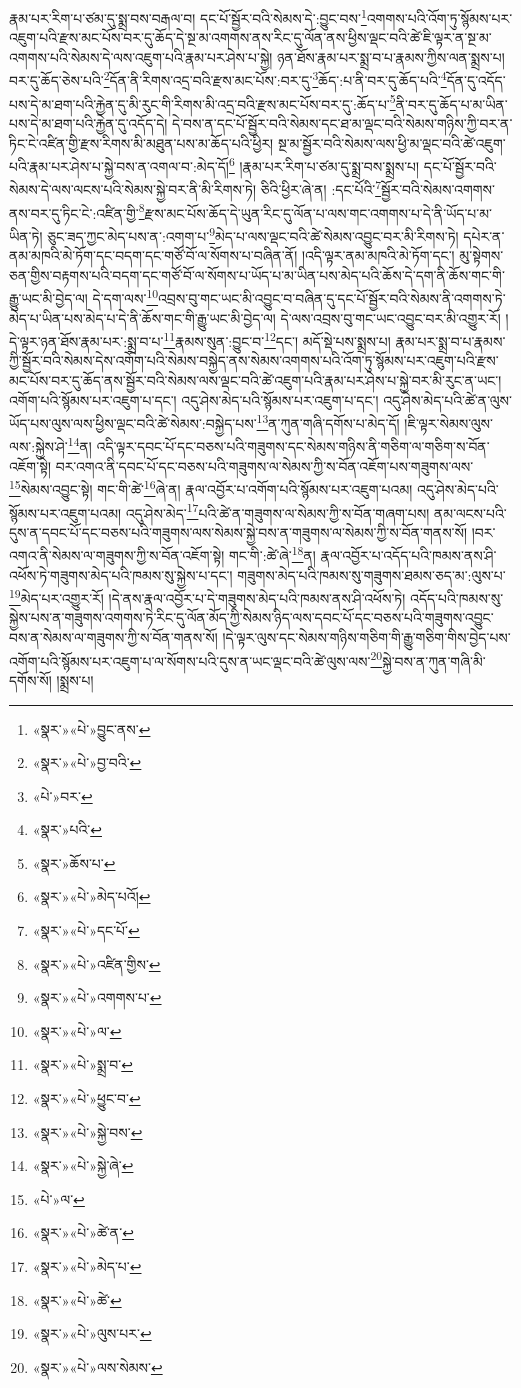 རྣམ་པར་རིག་པ་ཙམ་དུ་སྨྲ་བས་བརྒལ་བ། དང་པོ་སྦྱོར་བའི་སེམས་དེ་:བྱུང་བས་\footnote{«སྣར་»«པེ་»བྱུང་ནས་}འགགས་པའི་འོག་ཏུ་སྙོམས་པར་འཇུག་པའི་རྫས་མང་པོས་བར་དུ་ཆོད་དེ་སྔ་མ་འགགས་ནས་རིང་དུ་ལོན་ནས་ཕྱིས་ལྡང་བའི་ཚེ་ཇི་ལྟར་ན་སྔ་མ་འགགས་པའི་སེམས་དེ་ལས་འཇུག་པའི་རྣམ་པར་ཤེས་པ་སྐྱེ། ཉན་ཐོས་རྣམ་པར་སྨྲ་བ་པ་རྣམས་ཀྱིས་ལན་སྨྲས་པ། བར་དུ་ཆོད་ཅེས་པའི་\footnote{«སྣར་»«པེ་»བྱ་བའི་}དོན་ནི་རིགས་འདྲ་བའི་རྫས་མང་པོས་:བར་དུ་\footnote{«པེ་»བར་}ཆོད་:པ་ནི་བར་དུ་ཆོད་པའི་\footnote{«སྣར་»པའི་}དོན་དུ་འདོད་པས་དེ་མ་ཐག་པའི་རྐྱེན་དུ་མི་རུང་གི་རིགས་མི་འདྲ་བའི་རྫས་མང་པོས་བར་དུ་:ཆོད་པ་\footnote{«སྣར་»ཆོས་པ་}ནི་བར་དུ་ཆོད་པ་མ་ཡིན་པས་དེ་མ་ཐག་པའི་རྐྱེན་དུ་འདོད་དེ། དེ་བས་ན་དང་པོ་སྦྱོར་བའི་སེམས་དང་ཐ་མ་ལྡང་བའི་སེམས་གཉིས་ཀྱི་བར་ན་ཏིང་ངེ་འཛིན་གྱི་རྫས་རིགས་མི་མཐུན་པས་མ་ཆོད་པའི་ཕྱིར། སྔ་མ་སྦྱོར་བའི་སེམས་ལས་ཕྱི་མ་ལྡང་བའི་ཚེ་འཇུག་པའི་རྣམ་པར་ཤེས་པ་སྐྱེ་བས་ན་འགལ་བ་:མེད་དོ།\footnote{«སྣར་»«པེ་»མེད་པའོ།} །རྣམ་པར་རིག་པ་ཙམ་དུ་སྨྲ་བས་སྨྲས་པ། དང་པོ་སྦྱོར་བའི་སེམས་དེ་ལས་ལངས་པའི་སེམས་སྐྱེ་བར་ནི་མི་རིགས་ཏེ། ཅིའི་ཕྱིར་ཞེ་ན། :དང་པོའི་\footnote{«སྣར་»«པེ་»དང་པོ་}སྦྱོར་བའི་སེམས་འགགས་ནས་བར་དུ་ཏིང་ངེ་:འཛིན་གྱི་\footnote{«སྣར་»«པེ་»འཛིན་གྱིས་}རྫས་མང་པོས་ཆོད་དེ་ཡུན་རིང་དུ་ལོན་པ་ལས་གང་འགགས་པ་དེ་ནི་ཡོད་པ་མ་ཡིན་ཏེ། ཅུང་ཟད་ཀྱང་མེད་པས་ན་:འགག་པ་\footnote{«སྣར་»«པེ་»འགགས་པ་}མེད་པ་ལས་ལྡང་བའི་ཚེ་སེམས་འབྱུང་བར་མི་རིགས་ཏེ། དཔེར་ན་ནམ་མཁའི་མེ་ཏོག་དང་བདག་དང་གཙོ་བོ་ལ་སོགས་པ་བཞིན་ནོ། །འདི་ལྟར་ནམ་མཁའི་མེ་ཏོག་དང་། མུ་སྟེགས་ཅན་གྱིས་བརྟགས་པའི་བདག་དང་གཙོ་བོ་ལ་སོགས་པ་ཡོད་པ་མ་ཡིན་པས་མེད་པའི་ཆོས་དེ་དག་ནི་ཆོས་གང་གི་རྒྱུ་ཡང་མི་བྱེད་ལ། དེ་དག་ལས་\footnote{«སྣར་»«པེ་»ལ་}འབྲས་བུ་གང་ཡང་མི་འབྱུང་བ་བཞིན་དུ་དང་པོ་སྦྱོར་བའི་སེམས་ནི་འགགས་ཏེ་མེད་པ་ཡིན་པས་མེད་པ་དེ་ནི་ཆོས་གང་གི་རྒྱུ་ཡང་མི་བྱེད་ལ། དེ་ལས་འབྲས་བུ་གང་ཡང་འབྱུང་བར་མི་འགྱུར་རོ། །དེ་ལྟར་ཉན་ཐོས་རྣམ་པར་:སྨྲ་བ་པ་\footnote{«སྣར་»«པེ་»སྨྲ་བ་}རྣམས་སུན་:བྱུང་བ་\footnote{«སྣར་»«པེ་»ཕྱུང་བ་}དང་། མདོ་སྡེ་པས་སྨྲས་པ། རྣམ་པར་སྨྲ་བ་པ་རྣམས་ཀྱི་སྦྱོར་བའི་སེམས་དེས་འགོག་པའི་སེམས་བསྐྱེད་ནས་སེམས་འགགས་པའི་འོག་ཏུ་སྙོམས་པར་འཇུག་པའི་རྫས་མང་པོས་བར་དུ་ཆོད་ནས་སྦྱོར་བའི་སེམས་ལས་ལྡང་བའི་ཚེ་འཇུག་པའི་རྣམ་པར་ཤེས་པ་སྐྱེ་བར་མི་རུང་ན་ཡང་། འགོག་པའི་སྙོམས་པར་འཇུག་པ་དང་། འདུ་ཤེས་མེད་པའི་སྙོམས་པར་འཇུག་པ་དང་། འདུ་ཤེས་མེད་པའི་ཚེ་ན་ལུས་ཡོད་པས་ལུས་ལས་ཕྱིས་ལྡང་བའི་ཚེ་སེམས་:བསྐྱེད་པས་\footnote{«སྣར་»«པེ་»སྐྱེ་བས་}ན་ཀུན་གཞི་དགོས་པ་མེད་དོ། །ཇི་ལྟར་སེམས་ལུས་ལས་:སྐྱེས་ཤེ་\footnote{«སྣར་»«པེ་»སྐྱེ་ཞེ་}ན། འདི་ལྟར་དབང་པོ་དང་བཅས་པའི་གཟུགས་དང་སེམས་གཉིས་ནི་གཅིག་ལ་གཅིག་ས་བོན་འཇོག་སྟེ། བར་འགའ་ནི་དབང་པོ་དང་བཅས་པའི་གཟུགས་ལ་སེམས་ཀྱི་ས་བོན་འཇོག་པས་གཟུགས་ལས་\footnote{«པེ་»ལ་}སེམས་འབྱུང་སྟེ། གང་གི་ཚེ་\footnote{«སྣར་»«པེ་»ཚེ་ན་}ཞེ་ན། རྣལ་འབྱོར་པ་འགོག་པའི་སྙོམས་པར་འཇུག་པའམ། འདུ་ཤེས་མེད་པའི་སྙོམས་པར་འཇུག་པའམ། འདུ་ཤེས་མེད་\footnote{«སྣར་»«པེ་»མེད་པ་}པའི་ཚེ་ན་གཟུགས་ལ་སེམས་ཀྱི་ས་བོན་གཞག་པས། ནམ་ལངས་པའི་དུས་ན་དབང་པོ་དང་བཅས་པའི་གཟུགས་ལས་སེམས་སྐྱེ་བས་ན་གཟུགས་ལ་སེམས་ཀྱི་ས་བོན་གནས་སོ། །བར་འགའ་ནི་སེམས་ལ་གཟུགས་ཀྱི་ས་བོན་འཇོག་སྟེ། གང་གི་:ཚེ་ཞེ་\footnote{«སྣར་»«པེ་»ཚེ་}ན། རྣལ་འབྱོར་པ་འདོད་པའི་ཁམས་ནས་ཤི་འཕོས་ཏེ་གཟུགས་མེད་པའི་ཁམས་སུ་སྐྱེས་པ་དང་། གཟུགས་མེད་པའི་ཁམས་སུ་གཟུགས་ཐམས་ཅད་མ་:ལུས་པ་\footnote{«སྣར་»«པེ་»ལུས་པར་}མེད་པར་འགྱུར་རོ། །དེ་ནས་རྣལ་འབྱོར་པ་དེ་གཟུགས་མེད་པའི་ཁམས་ནས་ཤི་འཕོས་ཏེ། འདོད་པའི་ཁམས་སུ་སྐྱེས་པས་ན་གཟུགས་འགགས་ཏེ་རིང་དུ་ལོན་མོད་ཀྱི་སེམས་ཉིད་ལས་དབང་པོ་དང་བཅས་པའི་གཟུགས་འབྱུང་བས་ན་སེམས་ལ་གཟུགས་ཀྱི་ས་བོན་གནས་སོ། །དེ་ལྟར་ལུས་དང་སེམས་གཉིས་གཅིག་གི་རྒྱུ་གཅིག་གིས་བྱེད་པས་འགོག་པའི་སྙོམས་པར་འཇུག་པ་ལ་སོགས་པའི་དུས་ན་ཡང་ལྡང་བའི་ཚེ་ལུས་ལས་\footnote{«སྣར་»«པེ་»ལས་སེམས་}སྐྱེ་བས་ན་ཀུན་གཞི་མི་དགོས་སོ། །སྨྲས་པ། 